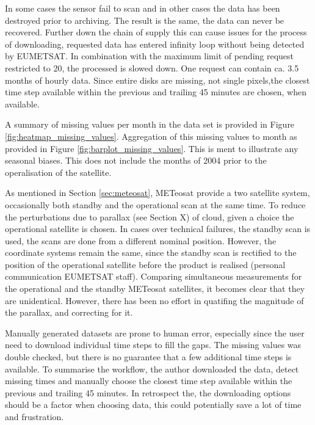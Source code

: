 In some cases the sensor fail to scan and in other cases the data has been destroyed prior to archiving. The result is the same, the data can never be recovered. Further down the chain of supply this can cause issues for the process of downloading, requested data has entered infinity loop without being detected by EUMETSAT. In combination with the maximum limit of pending request restricted to 20, the processed is slowed down. One request can contain ca. 3.5 months of hourly data. Since entire disks are missing, not single pixels,the closest time step available within the previous and trailing 45 minutes are chosen, when available. 

A summary of missing values per month in the data set is provided in Figure \ref{fig:heatmap_missing_values}. Aggregation of this missing values to month as provided in Figure \ref{fig:barplot_missing_values}. This is ment to illustrate any seasonal biases. This does not include the months of 2004 prior to the operalisation of the satellite.

As mentioned in Section \ref{sec:meteosat}, METeosat provide a two satellite system, occasionally both standby and the operational scan at the same time. To reduce the perturbations due to parallax (see Section X) of cloud, given a choice the operational satellite is chosen. In cases over technical failures, the standby scan is used, the scans are done from a different nominal position. However, the coordinate systems remain the same, since the standby scan is rectified to the position of the operational satellite before the product is realised (personal communication EUMETSAT staff). Comparing simultaneous measurements for the operational and the standby METeosat satellites, it becomes clear that they are unidentical. However, there has been no effort in quatifing the magnitude of the parallax, and correcting for it. 

Manually generated datasets are prone to human error, especially since the user need to download individual time steps to fill the gaps. The missing values was double checked, but there is no guarantee that a few additional time steps is available. To summarise the workflow, the author downloaded the data, detect missing times and manually choose the closest time step available within the previous and trailing 45 minutes. In retrospect the, the downloading options should be a factor when choosing data, this could potentially save a lot of time and frustration.


